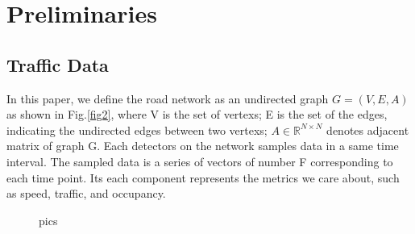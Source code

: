 \documentclass[conference]{IEEEtran}
\begin{document}
\section{Preliminaries}
\subsection{Traffic Data}
In this paper, we define the road network as an undirected graph 
\begin{math}
    G = (V,E,A)     
\end{math} as shown in Fig.\ref{fig2}, where V is the set of vertexs; E is the set of the edges, indicating the undirected edges between two vertexs; \begin{math} A \in  \mathbb{R}^{N\times N} \end{math} denotes adjacent matrix of graph G. Each detectors on the network samples data in a same time interval. The sampled data is a series of vectors of number F corresponding to each time point. Its each component represents the metrics we care about, such as speed, traffic, and occupancy.


\begin{figure}[htbp]
    \centering
    \centering
    \caption{ pics}
\end{figure}
\end{document}
